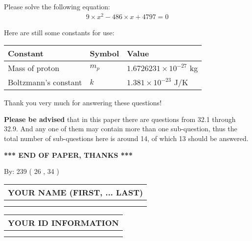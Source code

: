 \documentclass[12pt]{article}
\begin{document}
  
 
 

 
Please solve the following equation:
\begin{eqnarray*}
9 \times x^2  %
-486
                 \times x    %
+  %
4797 =0
\end{eqnarray*}
 

 

 
\vspace{0.3in}
   
   
 \vspace{0.2in}
Here are still some constants for use:
 
 
\noindent\begin{tabular}{|l|l|l|}
\hline
Constant & Symbol & Value \\
\hline
 
Mass of proton &
$m_p$ &
 $ 1.6726231 \times 10^{-27} $
kg \\
\hline
 
Boltzmann's constant &
$k$ &
 $ 1.381 \times 10^{-23} $
J/K \\
\hline
 
\end{tabular}
 
Thank you very much for answering these questions!
 
{\textbf{\large{Please be advised}}} that in this paper there are questions from
32.1 through
32.9.
And any one of them may contain more than one sub-question, thus the total number
of sub-questions here is around 14, of which
13 should be answered.
 
   
   
   
   
\vspace{1.0in} 
{\textbf{\large{ *** END OF PAPER, THANKS *** }}} 
   
   
\hspace{1.0in} By: 
         239 (          26 ,           34 )
   
   
   
   
\newpage 
\setcounter{page}{ 
    33001 } 
   
   
   
   
\noindent\begin{tabular}{|l|}
\hline
YOUR NAME (FIRST, ... LAST)  \\
\hline
 \\ 
 \\ 
\hline
\end{tabular}
\hspace{0.05in} \begin{tabular}{|l|}
\hline
 YOUR   ID   INFORMATION  \\
\hline
 \\ 
 \\ 
\hline
\end{tabular}
   
\end{document}

